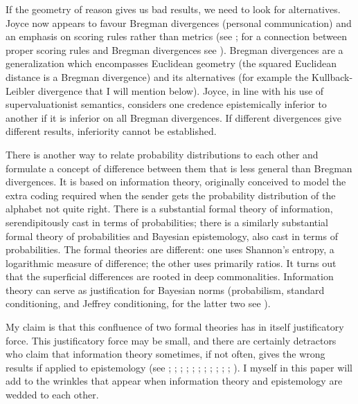 \documentclass[12pt]{article}
\begin{document}
If the geometry of reason gives us bad results, we need to look for
alternatives. Joyce now appears to favour Bregman divergences
(personal communication) and an emphasis on scoring rules rather than
metrics (see ; for a connection between
proper scoring rules and Bregman divergences see
). Bregman divergences are a
generalization which encompasses Euclidean geometry (the squared
Euclidean distance is a Bregman divergence) and its alternatives (for
example the Kullback-Leibler divergence that I will mention below).
Joyce, in line with his use of supervaluationist semantics, considers
one credence epistemically inferior to another if it is inferior on
all Bregman divergences. If different divergences give different
results, inferiority cannot be established.

There is another way to relate probability distributions to each other
and formulate a concept of difference between them that is less
general than Bregman divergences. It is based on information theory,
originally conceived to model the extra coding required when the
sender gets the probability distribution of the alphabet not quite
right. There is a substantial formal theory of information,
serendipitously cast in terms of probabilities; there is a similarly
substantial formal theory of probabilities and Bayesian epistemology,
also cast in terms of probabilities. The formal theories are
different: one uses Shannon's entropy, a logarithmic measure of
difference; the other uses primarily ratios. It turns out that the
superficial differences are rooted in deep commonalities. Information
theory can serve as justification for Bayesian norms (probabilism,
standard conditioning, and Jeffrey conditioning, for the latter two
see ).

My claim is that this confluence of two formal theories has in itself
justificatory force. This justificatory force may be small, and there
are certainly detractors who claim that information theory sometimes,
if not often, gives the wrong results if applied to epistemology (see
; ;
; ;
; ;
; ;
; ;
; ). I
myself in this paper will add to the wrinkles that appear when
information theory and epistemology are wedded to each other. 
\end{document}
